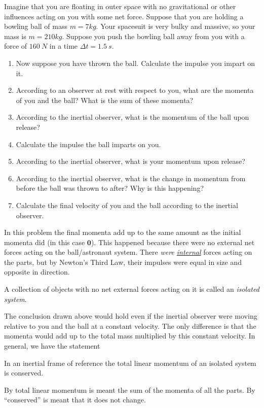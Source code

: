 \begin{exercise}
Imagine that you are floating in outer space with no gravitational or other influences acting on you with some net force. Suppose that you are holding a bowling ball of mass $m= 7 kg$. Your spacesuit is very bulky and massive, so your mass is $m=210 kg$. 
Suppose you push the bowling ball away from you with a force of $160\ N$ in a time $Δt = 1.5\ s$. 
\begin{enumerate}
\item Now suppose you have thrown the ball. Calculate the impulse you impart on it. 
\item According to an observer at rest with respect to you, what are the momenta of you and the ball? What is the sum of these momenta?
\item According to the inertial observer, what is the momentum of the ball upon release?
\item Calculate the impulse the ball imparts on you. 
\item According to the inertial observer, what is your momentum upon release? 
\item According to the inertial observer, what is the change in momentum from before the ball was thrown to after? Why is this happening?
\item Calculate the final velocity of you and the ball according to the inertial observer. 
\end{enumerate}
\end{exercise}

In this problem the final momenta add up to the same amount as the initial momenta did (in this case $𝟎$). This happened because there were no external net forces acting on the ball/astronaut system. There {\em were \underline{internal}} forces acting on the parts, but by Newton's Third Law, their impulses were equal in size and opposite in direction. 

\begin{definition}
A collection of objects with no net external forces acting on it is called an {\em isolated system}.
\end{definition}

The conclusion drawn above would hold even if the inertial observer were moving relative to you and the ball at a constant velocity. The only difference is that the momenta would add up to the total mass multiplied by this constant velocity. 
In general, we have the statement
\begin{theorem}
In an inertial frame of reference the total linear momentum of an isolated system is conserved. 
\end{theorem}
By total linear momentum is meant the sum of the momenta of all the parts. By “conserved” is meant that it does not change. 

